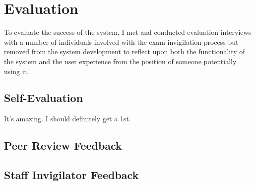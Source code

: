 \chapter{Evaluation}

To evaluate the success of the system, I met and conducted evaluation interviews with a number of individuals involved with the exam invigilation process but removed from the system development to reflect upon both the functionality of the system and the user experience from the position of someone potentially using it.

\section{Self-Evaluation}

It's amazing. I should definitely get a 1st.

\section{Peer Review Feedback}

\section{Staff Invigilator Feedback}